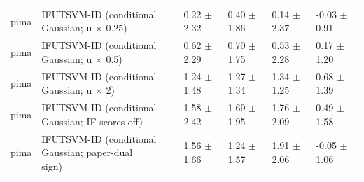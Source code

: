 \begin{table}[!t]
{\begin{tabular}{llllll}
pima & \shortstack[l]{IFUTSVM-ID (conditional\\Gaussian; u \(\times\) 0.25)} & 0.22 \(\pm\) 2.32 & 0.40 \(\pm\) 1.86 & 0.14 \(\pm\) 2.37 & -0.03 \(\pm\) 0.91 \\
pima & \shortstack[l]{IFUTSVM-ID (conditional\\Gaussian; u \(\times\) 0.5)} & 0.62 \(\pm\) 2.29 & 0.70 \(\pm\) 1.75 & 0.53 \(\pm\) 2.28 & 0.17 \(\pm\) 1.20 \\
pima & \shortstack[l]{IFUTSVM-ID (conditional\\Gaussian; u \(\times\) 2)} & 1.24 \(\pm\) 1.48 & 1.27 \(\pm\) 1.34 & 1.34 \(\pm\) 1.25 & 0.68 \(\pm\) 1.39 \\
pima & \shortstack[l]{IFUTSVM-ID (conditional\\Gaussian; IF scores off)} & 1.58 \(\pm\) 2.42 & 1.69 \(\pm\) 1.95 & 1.76 \(\pm\) 2.09 & 0.49 \(\pm\) 1.58 \\
pima & \shortstack[l]{IFUTSVM-ID (conditional\\Gaussian; paper-dual\\sign)} & 1.56 \(\pm\) 1.66 & 1.24 \(\pm\) 1.57 & 1.91 \(\pm\) 2.06 & -0.05 \(\pm\) 1.06 \\
\hline
\end{tabular}%
}
\end{table}

